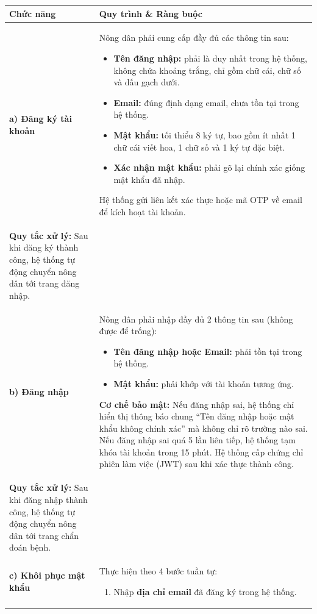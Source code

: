 \documentclass[12pt,a4paper]{article}
\begin{document}
\begin{longtable}{|
    >{\raggedright\arraybackslash}p{2.8cm}|
    >{\raggedright\arraybackslash}p{12cm}|}
\hline
\rowcolor{headerblue}
\textbf{Chức năng} & \textbf{Quy trình \& Ràng buộc} \\
\hline
\endhead
\textbf{a) Đăng ký tài khoản} &
Nông dân phải cung cấp đầy đủ các thông tin sau:
\begin{itemize}[leftmargin=*,topsep=2pt,itemsep=1pt]
    \item \textbf{Tên đăng nhập:} phải là duy nhất trong hệ thống, không chứa khoảng trắng, chỉ gồm chữ cái, chữ số và dấu gạch dưới.
    \item \textbf{Email:} đúng định dạng email, chưa tồn tại trong hệ thống.
    \item \textbf{Mật khẩu:} tối thiểu 8 ký tự, bao gồm ít nhất 1 chữ cái viết hoa, 1 chữ số và 1 ký tự đặc biệt.
    \item \textbf{Xác nhận mật khẩu:} phải gõ lại chính xác giống mật khẩu đã nhập.
\end{itemize}
Hệ thống gửi liên kết xác thực hoặc mã OTP về email để kích hoạt tài khoản. \\
\textbf{Quy tắc xử lý:} Sau khi đăng ký thành công, hệ thống tự động chuyển nông dân tới trang đăng nhập. \\
\hline
\textbf{b) Đăng nhập} &
Nông dân phải nhập đầy đủ 2 thông tin sau (không được để trống):
\begin{itemize}[leftmargin=*,topsep=2pt,itemsep=1pt]
    \item \textbf{Tên đăng nhập hoặc Email:} phải tồn tại trong hệ thống.
    \item \textbf{Mật khẩu:} phải khớp với tài khoản tương ứng.
\end{itemize}
\textbf{Cơ chế bảo mật:} Nếu đăng nhập sai, hệ thống chỉ hiển thị thông báo chung ``Tên đăng nhập hoặc mật khẩu không chính xác'' mà không chỉ rõ trường nào sai. Nếu đăng nhập sai quá 5 lần liên tiếp, hệ thống tạm khóa tài khoản trong 15 phút. Hệ thống cấp chứng chỉ phiên làm việc (JWT) sau khi xác thực thành công. \\
\textbf{Quy tắc xử lý:} Sau khi đăng nhập thành công, hệ thống tự động chuyển nông dân tới trang chẩn đoán bệnh. \\
\hline
\textbf{c) Khôi phục mật khẩu} &
Thực hiện theo 4 bước tuần tự:
\begin{enumerate}[leftmargin=*,topsep=2pt,itemsep=1pt]
    \item Nhập \textbf{địa chỉ email} đã đăng ký trong hệ thống.

\end{enumerate}
\end{longtable}
\end{document}
